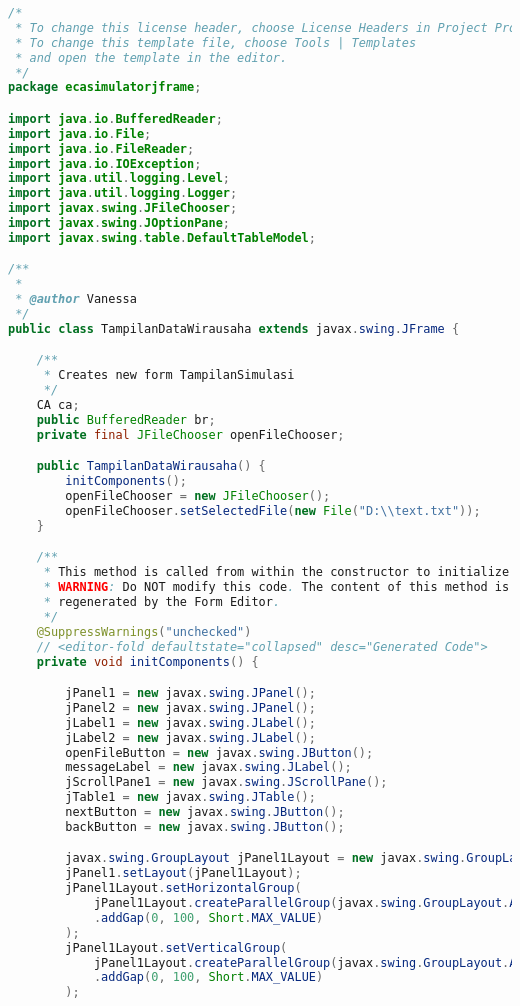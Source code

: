 \begin{lstlisting}[language=Java, caption=TampilanDataWirausaha.java]
/*
 * To change this license header, choose License Headers in Project Properties.
 * To change this template file, choose Tools | Templates
 * and open the template in the editor.
 */
package ecasimulatorjframe;

import java.io.BufferedReader;
import java.io.File;
import java.io.FileReader;
import java.io.IOException;
import java.util.logging.Level;
import java.util.logging.Logger;
import javax.swing.JFileChooser;
import javax.swing.JOptionPane;
import javax.swing.table.DefaultTableModel;

/**
 *
 * @author Vanessa
 */
public class TampilanDataWirausaha extends javax.swing.JFrame {

    /**
     * Creates new form TampilanSimulasi
     */
    CA ca;
    public BufferedReader br;
    private final JFileChooser openFileChooser;

    public TampilanDataWirausaha() {
        initComponents();
        openFileChooser = new JFileChooser();
        openFileChooser.setSelectedFile(new File("D:\\text.txt"));
    }

    /**
     * This method is called from within the constructor to initialize the form.
     * WARNING: Do NOT modify this code. The content of this method is always
     * regenerated by the Form Editor.
     */
    @SuppressWarnings("unchecked")
    // <editor-fold defaultstate="collapsed" desc="Generated Code">                          
    private void initComponents() {

        jPanel1 = new javax.swing.JPanel();
        jPanel2 = new javax.swing.JPanel();
        jLabel1 = new javax.swing.JLabel();
        jLabel2 = new javax.swing.JLabel();
        openFileButton = new javax.swing.JButton();
        messageLabel = new javax.swing.JLabel();
        jScrollPane1 = new javax.swing.JScrollPane();
        jTable1 = new javax.swing.JTable();
        nextButton = new javax.swing.JButton();
        backButton = new javax.swing.JButton();

        javax.swing.GroupLayout jPanel1Layout = new javax.swing.GroupLayout(jPanel1);
        jPanel1.setLayout(jPanel1Layout);
        jPanel1Layout.setHorizontalGroup(
            jPanel1Layout.createParallelGroup(javax.swing.GroupLayout.Alignment.LEADING)
            .addGap(0, 100, Short.MAX_VALUE)
        );
        jPanel1Layout.setVerticalGroup(
            jPanel1Layout.createParallelGroup(javax.swing.GroupLayout.Alignment.LEADING)
            .addGap(0, 100, Short.MAX_VALUE)
        );


\end{lstlisting}
